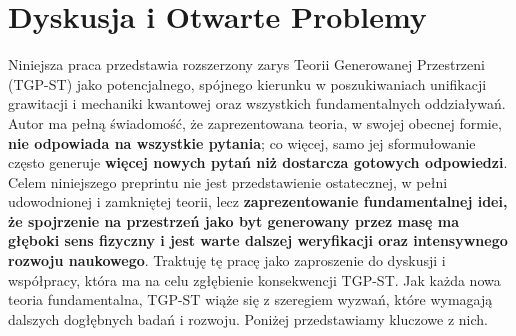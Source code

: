 \documentclass[11pt,a4paper]{article}
\begin{document}
\section{Dyskusja i Otwarte Problemy}
\label{sec:OtwarteProblemy}

Niniejsza praca przedstawia rozszerzony zarys Teorii Generowanej Przestrzeni (TGP-ST) jako potencjalnego, spójnego kierunku w poszukiwaniach unifikacji grawitacji i mechaniki kwantowej oraz wszystkich fundamentalnych oddziaływań. Autor ma pełną świadomość, że zaprezentowana teoria, w swojej obecnej formie, \textbf{nie odpowiada na wszystkie pytania}; co więcej, samo jej sformułowanie często generuje \textbf{więcej nowych pytań niż dostarcza gotowych odpowiedzi}. Celem niniejszego preprintu nie jest przedstawienie ostatecznej, w pełni udowodnionej i zamkniętej teorii, lecz \textbf{zaprezentowanie fundamentalnej idei, że spojrzenie na przestrzeń jako byt generowany przez masę ma głęboki sens fizyczny i jest warte dalszej weryfikacji oraz intensywnego rozwoju naukowego}. Traktuję tę pracę jako zaproszenie do dyskusji i współpracy, która ma na celu zgłębienie konsekwencji TGP-ST. Jak każda nowa teoria fundamentalna, TGP-ST wiąże się z szeregiem wyzwań, które wymagają dalszych dogłębnych badań i rozwoju. Poniżej przedstawiamy kluczowe z nich.
\end{document}

